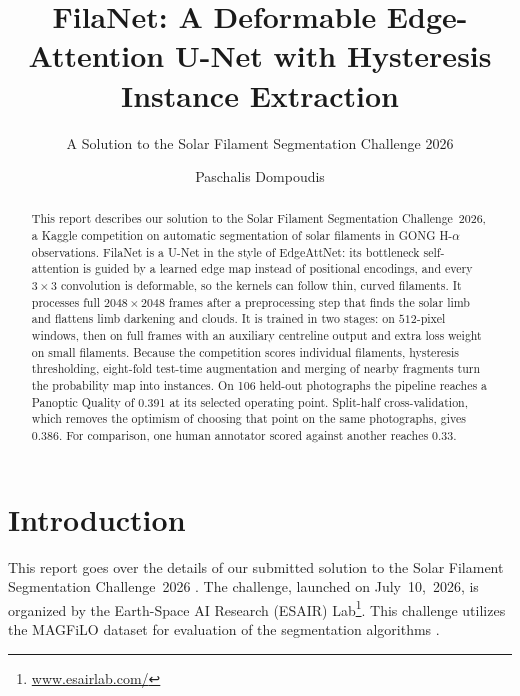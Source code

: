 \documentclass[sigconf]{acmart}
\begin{document}
\title{FilaNet: A Deformable Edge-Attention U-Net with Hysteresis Instance Extraction}
\subtitle{A Solution to the Solar Filament Segmentation Challenge 2026}


\author{Paschalis Dompoudis}

\begin{abstract}
    This report describes our solution to the Solar Filament Segmentation Challenge~2026, a Kaggle competition on automatic segmentation of solar filaments in GONG H-$\alpha$ observations. FilaNet is a U-Net in the style of EdgeAttNet: its bottleneck self-attention is guided by a learned edge map instead of positional encodings, and every $3\times3$ convolution is deformable, so the kernels can follow thin, curved filaments. It processes full $2048\times2048$ frames after a preprocessing step that finds the solar limb and flattens limb darkening and clouds. It is trained in two stages: on $512$-pixel windows, then on full frames with an auxiliary centreline output and extra loss weight on small filaments. Because the competition scores individual filaments, hysteresis thresholding, eight-fold test-time augmentation and merging of nearby fragments turn the probability map into instances. On 106 held-out photographs the pipeline reaches a Panoptic Quality of 0.391 at its selected operating point. Split-half cross-validation, which removes the optimism of choosing that point on the same photographs, gives 0.386. For comparison, one human annotator scored against another reaches 0.33.
\end{abstract}

\maketitle

\ifguideStyle
{}
\par\medskip
\fi

\section{Introduction}
    This report goes over the details of our submitted solution to the Solar Filament Segmentation Challenge~2026 \cite{filament-segmentation-2026}. The challenge, launched on July~10,~2026, is organized by the Earth-Space AI Research (ESAIR) Lab\footnote{\href{https://www.esairlab.com/home}{www.esairlab.com/}}. This challenge utilizes the MAGFiLO dataset for evaluation of the segmentation algorithms \cite{ahmadzadeh2024dataset}.
\end{document}
